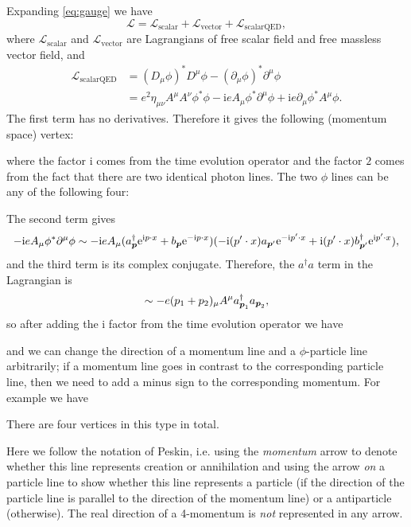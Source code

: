 \documentclass[hyperref, a4paper]{article}
\newcommand*{\ii}{\mathrm{i}}
\newcommand*{\ee}{\mathrm{e}}
\begin{document}
\begin{itemize}
Expanding \eqref{eq:gauge} we have 
\begin{equation}
    \mathcal{L} = \mathcal{L}_\text{scalar} + \mathcal{L}_\text{vector} + \mathcal{L}_\text{scalarQED},
\end{equation} 
where $\mathcal{L}_\text{scalar}$ and $\mathcal{L}_\text{vector}$ are Lagrangians of free scalar field and 
free massless vector field, and 
\begin{equation}
    \begin{aligned}
        \mathcal{L}_\text{scalarQED} &= (D_{\mu} \phi)^{*} D^{\mu} \phi - (\partial_\mu \phi)^* \partial^\mu \phi \\
        &= e^2 \eta_{\mu \nu} A^\mu A^\nu \phi^* \phi - \ii e A_\mu \phi^* \partial^\mu \phi + \ii e \partial_\mu \phi^* A^\mu \phi .
    \end{aligned}
\end{equation}
The first term has no derivatives. Therefore it gives the following (momentum space) vertex:

where the factor $\ii$ comes from the time evolution operator and the factor $2$ comes from the fact that there 
are two identical photon lines. The two $\phi$ lines can be any of the following four:

The second term gives
\[
    - \ii e A_\mu \phi^* \partial^\mu\phi \sim - \ii e A_{\mu} 
    (a^\dagger_{\vb*{p}} \ee^{\ii p \cdot x} + b_{\vb*{p}} \ee^{- \ii p \cdot x}) 
    (- \ii (p' \cdot x) a_{\vb*{p}'} \ee^{- \ii p' \cdot x} + \ii (p' \cdot x) b^\dagger_{\vb*{p}'} \ee^{\ii p' \cdot x}),
\]
and the third term is its complex conjugate. Therefore, the $a^\dagger a$ term in the Lagrangian is 
\[
    \sim - e(p_1 + p_2)_\mu A^\mu a^\dagger_{\vb*{p}_1} a_{\vb*{p}_2},
\]
so after adding the $\ii$ factor from the time evolution operator we have  

and we can change the direction of a momentum line and a $\phi$-particle line arbitrarily; if a momentum line 
goes in contrast to the corresponding particle line, then we need to add a minus sign to the corresponding 
momentum. For example we have

There are four vertices in this type in total.

\begin{note*}{}{}
    Here we follow the notation of Peskin, i.e. using the \emph{momentum} arrow to denote whether this line
    represents creation or annihilation and using the arrow \emph{on} a particle line to show whether this line 
    represents a particle (if the direction of the particle line is parallel to the direction of the momentum line)
    or a antiparticle (otherwise). The real direction of a 4-momentum is \emph{not} represented in any arrow.
\end{note*} 


\end{itemize}
\end{document}
